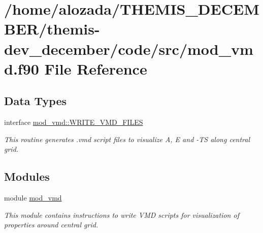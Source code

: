 \hypertarget{mod__vmd_8f90}{}\section{/home/alozada/\+T\+H\+E\+M\+I\+S\+\_\+\+D\+E\+C\+E\+M\+B\+E\+R/themis-\/dev\+\_\+december/code/src/mod\+\_\+vmd.f90 File Reference}
\label{mod__vmd_8f90}
\subsection*{Data Types}
\begin{DoxyCompactItemize}
\item 
interface \hyperlink{interfacemod__vmd_1_1WRITE__VMD__FILES}{mod\+\_\+vmd\+::\+W\+R\+I\+T\+E\+\_\+\+V\+M\+D\+\_\+\+F\+I\+L\+ES}
\begin{DoxyCompactList}\small\item\em This routine generates .vmd script files to visualize A, E and -\/\+TS along central grid. \end{DoxyCompactList}\end{DoxyCompactItemize}
\subsection*{Modules}
\begin{DoxyCompactItemize}
\item 
module \hyperlink{namespacemod__vmd}{mod\+\_\+vmd}
\begin{DoxyCompactList}\small\item\em This module contains instructions to write V\+MD scripts for visualization of properties around central grid. \end{DoxyCompactList}\end{DoxyCompactItemize}
